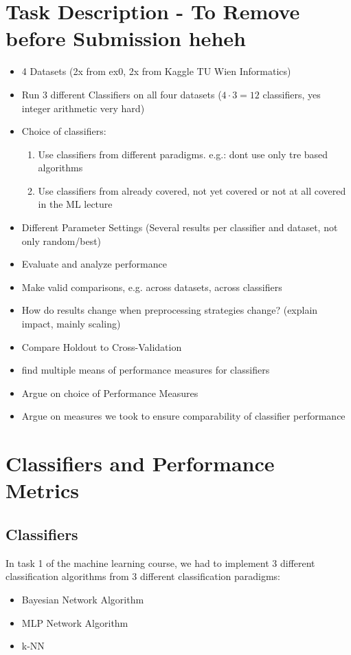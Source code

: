 \section*{Task Description - To Remove before Submission heheh}
\begin{itemize}
    \item 4 Datasets (2x from ex0, 2x from Kaggle TU Wien Informatics)
    \item Run 3 different Classifiers on all four datasets ($4 \cdot 3 = 12$ classifiers, yes integer arithmetic very hard)
    \item Choice of classifiers:
    \begin{enumerate}
    \item Use classifiers from different paradigms. e.g.: dont use only tre based algorithms
    \item Use classifiers from already covered, not yet covered or not at all covered in the ML lecture 
    \end{enumerate}
    \item Different Parameter Settings (Several results per classifier and dataset, not only random/best)
    \item Evaluate and analyze performance
    \item Make valid comparisons, e.g. across datasets, across classifiers
    \item How do results change when preprocessing strategies change? (explain impact, mainly scaling)
    \item Compare Holdout to Cross-Validation
    \item find multiple means of performance measures for classifiers
    \item Argue on choice of Performance Measures
    \item Argue on measures we took to ensure comparability of classifier performance
\end{itemize}

\section{Classifiers and Performance Metrics}
\subsection*{Classifiers}
In task 1 of the machine learning course, we had to implement 3 different classification algorithms from 3 different
classification paradigms:
\begin{itemize}
    \item Bayesian Network Algorithm
    \item MLP Network Algorithm
    \item k-NN
\end{itemize}